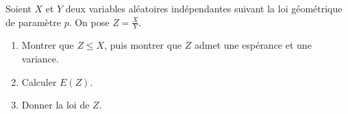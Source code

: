 \begin{enonce}
\begin{exercise}[ID={RMS135 E1496},subtitle={IMT MP 2024},tags={},difficulty={}]

Soient $X$ et $Y$ deux variables aléatoires indépendantes suivant la loi géométrique de paramètre $p$.
  On pose $Z = \frac{X}{Y}$.

\begin{enumerate}
  \item Montrer que $Z \leq X$, puis montrer que $Z$ admet une espérance et une variance.
  \item Calculer $E(Z)$.
  \item Donner la loi de $Z$.
\end{enumerate}

\end{exercise}
\begin{solution}
\end{solution}
\end{enonce}
